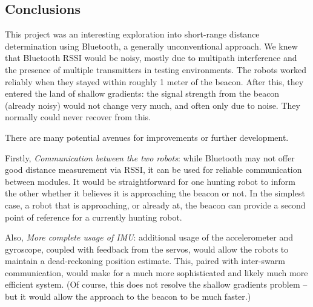 \documentclass[]{article}
\begin{document}
\subsection{Conclusions}

This project was an interesting exploration into short-range distance
determination using Bluetooth, a generally unconventional approach.
We knew that Bluetooth RSSI would be noisy, mostly due to multipath interference and the presence of multiple transmitters in testing environments.
The robots worked reliably when they stayed within roughly 1 meter of the beacon.
After this, they entered the land of shallow gradients:
the signal strength from the beacon (already noisy) would not change very
much, and often only due to noise.
They normally could never recover from this.



There are many potential avenues for improvements or further
development.

Firstly, \emph{Communication between the two robots}: while Bluetooth may not offer good distance measurement via RSSI, it can be used for reliable  communication between modules.
It would be straightforward for one hunting robot to inform the other whether it believes it is approaching the beacon or not.
In the simplest case, a robot that is approaching, or already at, the beacon can provide a second point of reference for a currently hunting robot.

Also, \emph{More complete usage of IMU}: additional usage of the accelerometer and gyroscope, coupled with feedback from the servos, would allow the robots to maintain a dead-reckoning position estimate.
This, paired with inter-swarm communication, would make for a much more sophisticated and likely much more efficient system.
(Of course, this does not resolve the shallow gradients problem -- but it would allow the approach to the beacon to be much faster.)

{}

\end{document}
